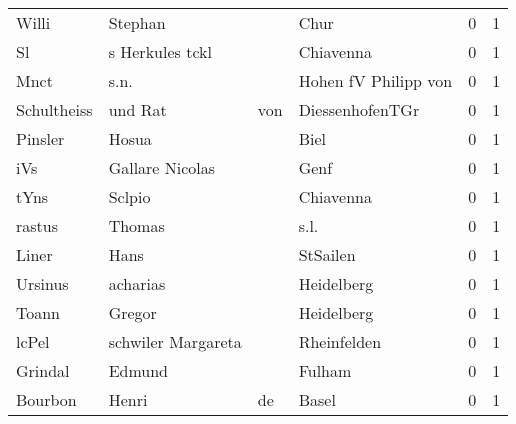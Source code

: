 \begin{center}
\begin{tiny}
\begin{longtabu}{llllrr}
                    Willi &                            Stephan &             &                                        Chur &          0 &         1 \\
                       Sl &                    s Herkules tckl &             &                                   Chiavenna &          0 &         1 \\
                     Mnct &                               s.n. &             &                        Hohen fV Philipp von &          0 &         1 \\
              Schultheiss &                            und Rat &         von &                             DiessenhofenTGr &          0 &         1 \\
                  Pinsler &                              Hosua &             &                                        Biel &          0 &         1 \\
                      iVs &                    Gallare Nicolas &             &                                        Genf &          0 &         1 \\
                     tYns &                             Sclpio &             &                                   Chiavenna &          0 &         1 \\
                   rastus &                             Thomas &             &                                        s.l. &          0 &         1 \\
                    Liner &                               Hans &             &                                    StSailen &          0 &         1 \\
                  Ursinus &                           acharias &             &                                  Heidelberg &          0 &         1 \\
                    Toann &                             Gregor &             &                                  Heidelberg &          0 &         1 \\
                    lcPel &                 schwiler Margareta &             &                                 Rheinfelden &          0 &         1 \\
                  Grindal &                             Edmund &             &                                      Fulham &          0 &         1 \\
                  Bourbon &                              Henri &          de &                                       Basel &          0 &         1 \\

\end{longtabu}
\end{tiny}
\end{center}
